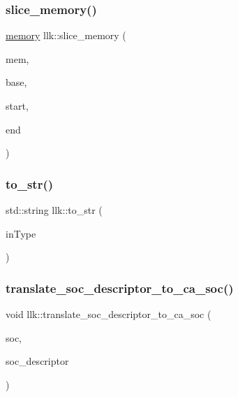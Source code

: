 \mbox{\label{namespacellk_adb43fe0eeac466803ff0566f52b4f7a8}} 
\subsubsection{\texorpdfstring{slice\+\_\+memory()}{slice\_memory()}}
{\footnotesize\ttfamily \hyperlink{classllk_1_1memory}{memory} llk\+::slice\+\_\+memory (\begin{DoxyParamCaption}\item[{const \hyperlink{classllk_1_1memory}{memory} \&}]{mem,  }\item[{\hyperlink{classllk_1_1memory_ae7a4b897aa999f22e250dc8e4d773dec}{memory\+::address\+\_\+t}}]{base,  }\item[{\hyperlink{classllk_1_1memory_ae7a4b897aa999f22e250dc8e4d773dec}{memory\+::address\+\_\+t}}]{start,  }\item[{\hyperlink{classllk_1_1memory_ae7a4b897aa999f22e250dc8e4d773dec}{memory\+::address\+\_\+t}}]{end }\end{DoxyParamCaption})}

\mbox{\label{namespacellk_a7477ba6804f7b1d71805930f84bfe85f}} 
\subsubsection{\texorpdfstring{to\+\_\+str()}{to\_str()}}
{\footnotesize\ttfamily std\+::string llk\+::to\+\_\+str (\begin{DoxyParamCaption}\item[{const Data\+Format}]{in\+Type }\end{DoxyParamCaption})}

\mbox{\label{namespacellk_a15c1d720bf035c008aea9ba25a7150eb}} 
\subsubsection{\texorpdfstring{translate\+\_\+soc\+\_\+descriptor\+\_\+to\+\_\+ca\+\_\+soc()}{translate\_soc\_descriptor\_to\_ca\_soc()}}
{\footnotesize\ttfamily void llk\+::translate\+\_\+soc\+\_\+descriptor\+\_\+to\+\_\+ca\+\_\+soc (\begin{DoxyParamCaption}\item[{C\+A\+::\+Soc \&}]{soc,  }\item[{const \hyperlink{structllk_1_1SocDescriptor}{llk\+::\+Soc\+Descriptor}}]{soc\+\_\+descriptor }\end{DoxyParamCaption})}




